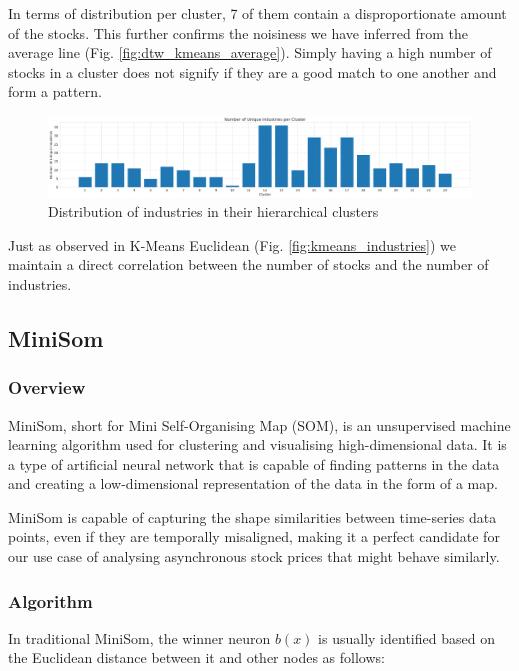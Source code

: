 \documentclass[11pt]{article}
\begin{document}
In terms of distribution per cluster, 7 of them contain a disproportionate amount of the stocks. This further confirms the noisiness we have inferred from the average line (Fig. \ref{fig:dtw_kmeans_average}). Simply having a high number of stocks in a cluster does not signify if they are a good match to one another and form a pattern.

\begin{figure}[H]
\centering
\includegraphics[width=12cm]{img/kernel-industries.png} 
\caption{Distribution of industries in their hierarchical clusters}
\label{fig:kernel_industries}
\end{figure}

Just as observed in K-Means Euclidean (Fig. \ref{fig:kmeans_industries}) we maintain a direct correlation between the number of stocks and the number of industries. 

\subsection{MiniSom}
\subsubsection{Overview}

MiniSom, short for Mini Self-Organising Map (SOM), is an unsupervised machine learning algorithm used for clustering and visualising high-dimensional data. It is a type of artificial neural network that is capable of finding patterns in the data and creating a low-dimensional representation of the data in the form of a map. 

 MiniSom is capable of capturing the shape similarities between time-series data points, even if they are temporally misaligned, making it a perfect candidate for our use case of analysing asynchronous stock prices that might behave similarly. 
 
\subsubsection{Algorithm}

In traditional MiniSom, the winner neuron \( b(x) \) is usually identified based on the Euclidean distance between it and other nodes as follows:
\end{document}

